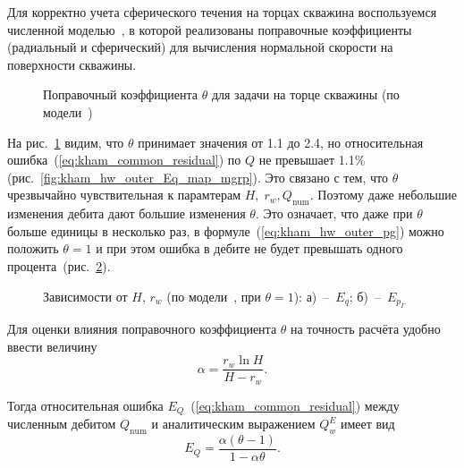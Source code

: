 \documentclass{article}
\begin{document}
Для корректно учета сферического течения на торцах скважина воспользуемся численной моделью~\cite{lit:kham_mazo_uzku_2015}, в которой реализованы поправочные коэффициенты (радиальный и сферический) для вычисления нормальной скорости на поверхности скважины.

\begin{figure}[!ht]
\centering

\caption{Поправочный коэффициента $\theta$ для задачи на торце скважины (по модели~\cite{lit:kham_mazo_uzku_2015})}
\label{fig:kham_hw_outer_theta_map_mgrp}
\end{figure}

На рис.~\ref{fig:kham_hw_outer_theta_map_mgrp} видим, что $\theta$ принимает значения от 1.1 до 2.4, но относительная ошибка~(\ref{eq:kham_common_residual}) по $Q$ не превышает 1.1\% (рис.~\ref{fig:kham_hw_outer_Eq_map_mgrp}). Это связано с тем, что $\theta$ чрезвычайно чувствительная к парамтерам $H, \; r_w, Q_{\text{num}}$. Поэтому даже небольшие изменения дебита дают большие изменения $\theta$. Это означает, что даже при $\theta$ больше единицы в несколько раз, в формуле~(\ref{eq:kham_hw_outer_pg}) можно положить $\theta=1$ и при этом ошибка в дебите не будет превышать одного процента~(рис.~\ref{fig:kham_hw_outer_eq_map_mgrp}).

\begin{figure}[!ht]
\centering
\begin{subfigure}{0.48\textwidth}
\centering

\caption{}
\label{fig:kham_hw_outer_eq_map_mgrp}
\end{subfigure}
\hfill
\begin{subfigure}{0.48\textwidth}
\centering

\caption{}
\label{fig:kham_hw_outer_epg_map_mgrp}
\end{subfigure}
\caption{
Зависимости от $H$, $r_w$ (по модели~\cite{lit:kham_mazo_uzku_2015}, при $\theta = 1$):
а)~--~$E_q$;
б)~--~$E_{p_{\Gamma}}$
}
\label{fig:kham_hw_outer_theta_epg_maps_mgrp}
\end{figure}

Для оценки влияния поправочного коэффициента $\theta$ на точность расчёта удобно ввести величину
\[
\alpha = \frac{r_w \ln H}{H-r_w}.
\]

Тогда относительная ошибка $E_Q$~(\ref{eq:kham_common_residual}) между численным дебитом $Q_{\text{num}}$ и аналитическим выражением $Q_w^E$ имеет вид
\begin{equation}
E_Q = \dfrac{\alpha(\theta-1)}{1-\alpha\theta}.
\label{eq:kham_theta_error_exact}
\end{equation}
\end{document}
